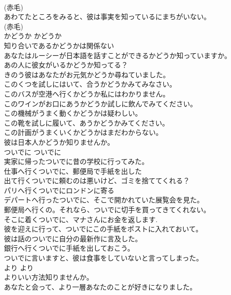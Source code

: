 \documentclass[8pt]{extreport}
\begin{document}
\begin{CJK}{UTF8}{min}
\\	(赤毛)
\\	あわてたところをみると、彼は事実を知っているにまちがいない。  
\\	(赤毛)
\\	かどうか	かどうか	
\\	知り合いであるかどうかは関係ない  
\\	あなたはルーシーが日本語を話すことができるかどうか知っていますか。  
\\	あの人に彼女がいるかどうか知ってる？  
\\	きのう彼はあなたがお元気かどうか尋ねていました。   
\\	このくつを試しにはいて、合うかどうかみてみなさい。   
\\	このバスが空港へ行くかどうか私にはわかりません。   
\\	このワインがお口にあうかどうか試しに飲んでみてください。   
\\	この機械がうまく動くかどうかは疑わしい。   
\\	この靴を試しに履いて、あうかどうかみてください。   
\\	この計画がうまくいくかどうかはまだわからない。   
\\	彼は日本人かどうか知りませんか。  
\\	ついでに	ついでに	
\\	実家に帰ったついでに昔の学校に行ってみた。  
\\	仕事へ行くついでに、郵便局で手紙を出した  
\\	出て行くついでに頼むのは悪いけど、ゴミを捨ててくれる？  
\\	パリへ行くついでにロンドンに寄る  
\\	デパートへ行ったついでに、そこで開かれていた展覧会を見た。   
\\	郵便局へ行くの。それなら、ついでに切手を買ってきてくれない。  
\\	そこに着くついでに、マナさんにお金を返します.  
\\	彼を迎えに行って、ついでにこの手紙をポストに入れておいて。   
\\	彼は話のついでに自分の最新作に言及した。   
\\	銀行へ行くついでに手紙を出しておこう。   
\\	ついでに言いますと、彼は食事をしていないと言ってしまった。   
\\	より	より	
\\	よりいい方法知りませんか。  
\\	あなたと会って、より一層あなたのことが好きになりました。  

\end{CJK}
\end{document}
